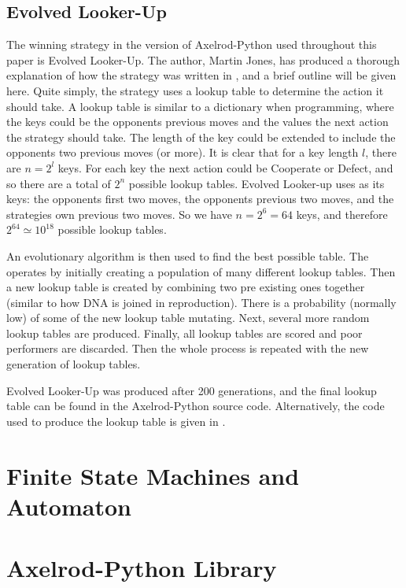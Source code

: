 \subsection{Evolved Looker-Up}\label{ssec:strat_evolved_lu}
The winning strategy in the version of Axelrod-Python used throughout this paper is Evolved Looker-Up.
The author, Martin Jones, has produced a thorough explanation of how the strategy was written in \cite{MoJones}, and a brief outline will be given here.
Quite simply, the strategy uses a lookup table to determine the action it should take.
A lookup table is similar to a dictionary when programming, where the keys could be the opponents previous moves and the values the next action the strategy should take.
The length of the key could be extended to include the opponents two previous moves (or more).
It is clear that for a key length $l$, there are $n = 2^l$ keys.
For each key the next action could be Cooperate or Defect, and so there are a total of $2^n$ possible lookup tables.
Evolved Looker-up uses as its keys: the opponents first two moves, the opponents previous two moves, and the strategies own previous two moves.
So we have $n = 2^6 = 64$ keys, and therefore $2^{64} \simeq 10^{18}$ possible lookup tables.

An evolutionary algorithm is then used to find the best possible table.
The operates by initially creating a population of many different lookup tables.
Then a new lookup table is created by combining two pre existing ones together (similar to how DNA is joined in reproduction).
There is a probability (normally low) of some of the new lookup table mutating.
Next, several more random lookup tables are produced.
Finally, all lookup tables are scored and poor performers are discarded.
Then the whole process is repeated with the new generation of lookup tables.

Evolved Looker-Up was produced after 200 generations, and the final lookup table can be found in the Axelrod-Python source code.
Alternatively, the code used to produce the lookup table is given in \cite{axelrod-evolver}.

\section{Finite State Machines and Automaton}

\section{Axelrod-Python Library}

